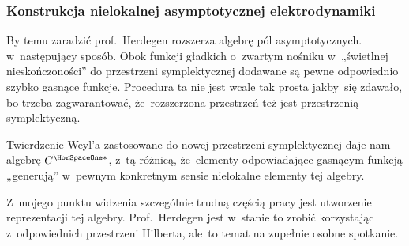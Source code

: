 \documentclass[10pt,t]{beamer}
\begin{document}






\begin{frame}
  \frametitle{Konstrukcja nielokalnej asymptotycznej
    elektrodynamiki}


  By temu zaradzić prof.~Herdegen rozszerza algebrę pól asymptotycznych.
  w~następujący sposób. Obok funkcji gładkich o~zwartym nośniku
  w~„świetlnej nieskończoności” do przestrzeni symplektycznej dodawane
  są pewne odpowiednio szybko gasnące funkcje. Procedura ta nie jest wcale
  tak prosta jakby~się zdawało, bo trzeba zagwarantować, że~rozszerzona
  przestrzeń też jest przestrzenią symplektyczną.

  Twierdzenie Weyl’a zastosowane do nowej przestrzeni symplektycznej daje
  nam algebrę $C^{ \HorSpaceOne * }$, z~tą różnicą, że~elementy
  odpowiadające gasnącym funkcją „generują” w~pewnym konkretnym sensie
  \alert{nielokalne} elementy tej algebry.

  Z~mojego punktu widzenia szczególnie trudną częścią pracy jest utworzenie
  reprezentacji tej algebry. Prof.~Herdegen jest w~stanie to zrobić
  korzystając z~odpowiednich
  przestrzeni Hilberta, ale~to temat na zupełnie osobne spotkanie.

\end{frame}
\end{document}
